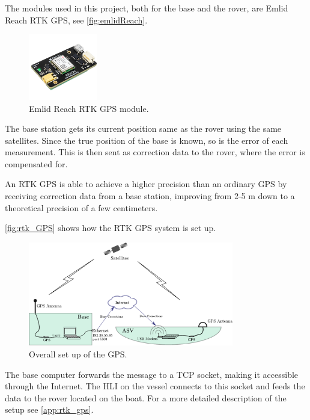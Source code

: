 The modules used in this project, both for the base and the rover, are Emlid Reach RTK GPS, see \autoref{fig:emlidReach}.

\begin{figure}[H]
  \includegraphics[width=0.27\textwidth]{figures/emlidReach}
  \caption{Emlid Reach RTK GPS module.\cite{EmlidReachDocs}}
  \label{fig:emlidReach}
\end{figure}

The base station gets its current position same as the rover using the same satellites. Since the true position of the base is known, so is the error of each measurement. This is then sent as correction data to the rover, where the error is compensated for. 

An RTK GPS is able to achieve a higher precision than an ordinary GPS by receiving correction data from a base station, improving from 2-5 m down to a theoretical precision of a few centimeters. \cite{EmlidRTK}


\autoref{fig:rtk_GPS} shows how the RTK GPS system is set up. 

\begin{figure}[H]
	\includegraphics[width=0.8\textwidth]{figures/comunicationSetup.pdf}
	\caption{Overall set up of the GPS.}
	\label{fig:rtk_GPS}
\end{figure}

The base computer forwards the message to a TCP socket, making it accessible through the Internet. The HLI on the vessel connects to this socket and feeds the data to the rover located on the boat. For a more detailed description of the setup see \autoref{app:rtk_gps}.
